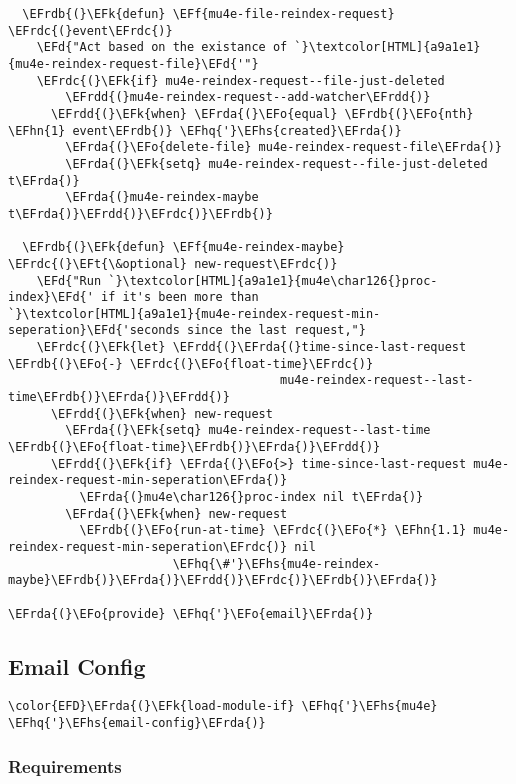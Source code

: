 \documentclass[a4wide,10pt]{article}
\newcommand{\EFd}[1]{\textcolor{EFd}{#1}} %
\newcommand{\EFk}[1]{\textcolor{EFk}{#1}} %
\newcommand{\EFf}[1]{\textcolor{EFf}{#1}} %
\newcommand{\EFt}[1]{\textcolor{EFt}{#1}} %
\newcommand{\EFo}[1]{\textcolor{EFo}{#1}} %
\newcommand{\EFhn}[1]{\textcolor{EFhn}{\textbf{#1}}} %
\newcommand{\EFhq}[1]{\textcolor{EFhq}{#1}} %
\newcommand{\EFhs}[1]{\textcolor{EFhs}{#1}} %
\newcommand{\EFrda}[1]{\textcolor{EFrda}{#1}} %
\newcommand{\EFrdb}[1]{\textcolor{EFrdb}{#1}} %
\newcommand{\EFrdc}[1]{\textcolor{EFrdc}{#1}} %
\newcommand{\EFrdd}[1]{\textcolor{EFrdd}{#1}} %
\begin{document}
\begin{Code}
\begin{Verbatim}
  \EFrdb{(}\EFk{defun} \EFf{mu4e-file-reindex-request} \EFrdc{(}event\EFrdc{)}
    \EFd{"Act based on the existance of `}\textcolor[HTML]{a9a1e1}{mu4e-reindex-request-file}\EFd{'"}
    \EFrdc{(}\EFk{if} mu4e-reindex-request--file-just-deleted
        \EFrdd{(}mu4e-reindex-request--add-watcher\EFrdd{)}
      \EFrdd{(}\EFk{when} \EFrda{(}\EFo{equal} \EFrdb{(}\EFo{nth} \EFhn{1} event\EFrdb{)} \EFhq{'}\EFhs{created}\EFrda{)}
        \EFrda{(}\EFo{delete-file} mu4e-reindex-request-file\EFrda{)}
        \EFrda{(}\EFk{setq} mu4e-reindex-request--file-just-deleted t\EFrda{)}
        \EFrda{(}mu4e-reindex-maybe t\EFrda{)}\EFrdd{)}\EFrdc{)}\EFrdb{)}

  \EFrdb{(}\EFk{defun} \EFf{mu4e-reindex-maybe} \EFrdc{(}\EFt{\&optional} new-request\EFrdc{)}
    \EFd{"Run `}\textcolor[HTML]{a9a1e1}{mu4e\char126{}proc-index}\EFd{' if it's been more than
`}\textcolor[HTML]{a9a1e1}{mu4e-reindex-request-min-seperation}\EFd{'seconds since the last request,"}
    \EFrdc{(}\EFk{let} \EFrdd{(}\EFrda{(}time-since-last-request \EFrdb{(}\EFo{-} \EFrdc{(}\EFo{float-time}\EFrdc{)}
                                      mu4e-reindex-request--last-time\EFrdb{)}\EFrda{)}\EFrdd{)}
      \EFrdd{(}\EFk{when} new-request
        \EFrda{(}\EFk{setq} mu4e-reindex-request--last-time \EFrdb{(}\EFo{float-time}\EFrdb{)}\EFrda{)}\EFrdd{)}
      \EFrdd{(}\EFk{if} \EFrda{(}\EFo{>} time-since-last-request mu4e-reindex-request-min-seperation\EFrda{)}
          \EFrda{(}mu4e\char126{}proc-index nil t\EFrda{)}
        \EFrda{(}\EFk{when} new-request
          \EFrdb{(}\EFo{run-at-time} \EFrdc{(}\EFo{*} \EFhn{1.1} mu4e-reindex-request-min-seperation\EFrdc{)} nil
                       \EFhq{\#'}\EFhs{mu4e-reindex-maybe}\EFrdb{)}\EFrda{)}\EFrdd{)}\EFrdc{)}\EFrdb{)}\EFrda{)}

\EFrda{(}\EFo{provide} \EFhq{'}\EFo{email}\EFrda{)}
\end{Verbatim}
\end{Code}

\subsection{Email Config}
\label{sec:org566cb76}
\begin{Code}
\begin{Verbatim}
\color{EFD}\EFrda{(}\EFk{load-module-if} \EFhq{'}\EFhs{mu4e} \EFhq{'}\EFhs{email-config}\EFrda{)}
\end{Verbatim}
\end{Code}
\subsubsection{Requirements}
\label{sec:orga5a798f}
\end{document}
